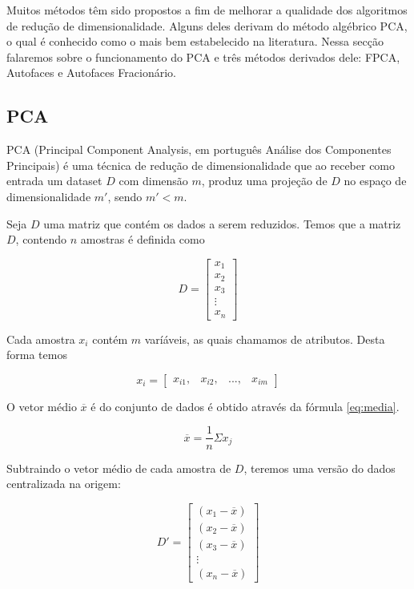 \documentclass[12pt]{article}
\begin{document}
Muitos métodos têm sido propostos a fim de melhorar a qualidade dos algoritmos de redução de dimensionalidade. Alguns deles derivam do método algébrico PCA, o qual é conhecido como o mais bem estabelecido na literatura. Nessa secção falaremos sobre o funcionamento do PCA e três métodos derivados dele: FPCA, Autofaces e Autofaces Fracionário.

\subsection{PCA}

PCA (Principal Component Analysis, em português Análise dos Componentes Principais) é  uma técnica de redução de dimensionalidade que ao receber como entrada um dataset $D$ com dimensão $m$, produz uma projeção de $D$ no espaço de dimensionalidade $m'$, sendo $m' < m$.

Seja $D$ uma matriz que contém os dados a serem reduzidos. Temos que a matriz $D$, contendo $n$ amostras é definida como

$$
D = \left[
\begin{array}{l}
x_1\\
x_2\\
x_3\\
\vdots\\
x_n
\end{array}
\right]
$$

Cada amostra $x_i$ contém $m$ varíáveis, as quais chamamos de atributos. Desta forma temos

$$
x_i = \left[
\begin{array}{cccc}
x_{i1}, &
x_{i2}, &
..., &
x_{im}
\end{array}
\right]
$$

O vetor médio $\overline{x}$ é do conjunto de dados é obtido através da fórmula \ref{eq:media}.

\begin{equation}
\overline{x} = \frac{1}{n} \Sigma x_j \label{eq:media}
\end{equation}

Subtraindo o vetor médio de cada amostra de $D$, teremos uma versão do dados centralizada na origem:

$$
D' = \left[
\begin{array}{l}
(x_1 - \overline{x})\\
(x_2 - \overline{x})\\
(x_3 - \overline{x})\\
\vdots\\
(x_n - \overline{x})
\end{array}
\right]
$$
\end{document}
